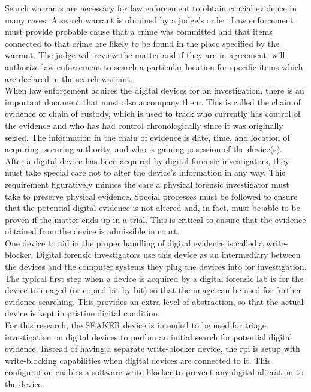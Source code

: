 \documentclass[12pt]{article}
\begin{document}
Search warrants are necessary for law enforcement to obtain crucial evidence in many
cases.  A search warrant is obtained by a judge's order.  Law enforcement must 
provide probable cause that a crime 
was committed and that items connected to that crime are likely to be found 
in the place specified by the warrant.  The judge will review the matter and if
they are in agreement, will authorize law enforcement to search a particular location
for specific items which are declared in the search warrant.\\

When law enforcement aquires the digital devices for an investigation, there is
an important document that must also accompany them.  This is called the chain of
evidence or chain of custody, which is used to track who currently has control
of the evidence and
who has had control chronologically since it was originally seized.
The information in the chain
of evidence is date, time, and location of acquiring, securing authority, and who is
gaining posession of the device(s).\\

After a digital device has been acquired by digital forensic investigators, they
must take special care not to alter the device's information in any way.  This 
requirement figuratively mimics the care a physical forensic investigator must
take to preserve physical evidence.  Special processes must be followed to ensure
that the potential digital evidence is not altered and, in fact, must be able to 
be proven if the matter ends up in a trial.  This is critical to ensure that the
evidence obtained from the device is admissible in court.\\

One device to aid in the proper handling of digital evidence is called a
write-blocker.  Digital forensic investigators use this device as an intermediary
between the devices and the computer systems they plug the devices into for
investigation.  The typical first step when a device is acquired by a digital
forensic lab is for the device to imaged (or copied bit by bit) so that the
image can be used for further evidence searching.  This provides an extra level of
abstraction, so that the actual device is kept in pristine digital condition.\\

For this research, the SEAKER device is intended to be used for triage investigation
on digital devices to perfom an initial search for potential digital evidence.
Instead of having a separate write-blocker device, the \gls{rpi} is setup with
write-blocking capabilities when digital devices are connected to it.  This
configuration enables a software-write-blocker to prevent any digital alteration
to the device.\\
\end{document}
